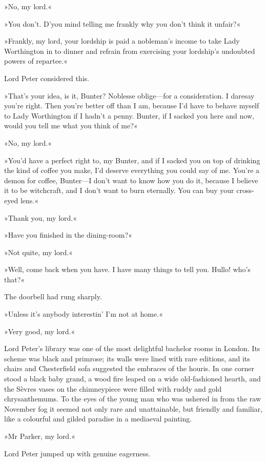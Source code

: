 »No, my lord.«

»You don't. D'you mind telling me frankly why you don't think it unfair?«

»Frankly, my lord, your lordship is paid a nobleman's income to take Lady Worthington in to dinner and refrain from exercising your lordship's undoubted powers of repartee.«

Lord Peter considered this.

»That's your idea, is it, Bunter? Noblesse oblige\allowbreak---\allowbreak for a consideration. I daresay you're right. Then you're better off than I am, because I'd have to behave myself to Lady Worthington if I hadn't a penny. Bunter, if I sacked you here and now, would you tell me what you think of me?«

»No, my lord.«

»You'd have a perfect right to, my Bunter, and if I sacked you on top of drinking the kind of coffee you make, I'd deserve everything you could say of me. You're a demon for coffee, Bunter\allowbreak---\allowbreak I don't want to know how you do it, because I believe it to be witchcraft, and I don't want to burn eternally. You can buy your cross-eyed lens.«

»Thank you, my lord.«

»Have you finished in the dining-room?«

»Not quite, my lord.«

»Well, come back when you have. I have many things to tell you. Hullo! who's that?«

The doorbell had rung sharply.

»Unless it's anybody interestin' I'm not at home.«

»Very good, my lord.«

Lord Peter's library was one of the most delightful bachelor rooms in London. Its scheme was black and primrose; its walls were lined with rare editions, and its chairs and Chesterfield sofa suggested the embraces of the houris. In one corner stood a black baby grand, a wood fire leaped on a wide old-fashioned hearth, and the Sèvres vases on the chimneypiece were filled with ruddy and gold chrysanthemums. To the eyes of the young man who was ushered in from the raw November fog it seemed not only rare and unattainable, but friendly and familiar, like a colourful and gilded paradise in a mediaeval painting.

»Mr Parker, my lord.«

Lord Peter jumped up with genuine eagerness.

